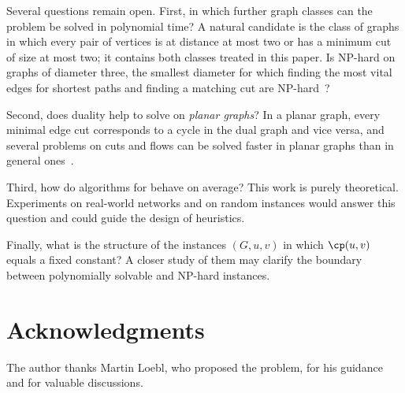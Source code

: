 Several questions remain open.
First, in which further graph classes can the problem be solved in polynomial time?
A natural candidate is the class of graphs in which every pair of vertices is at distance at most two or has a minimum cut of size at most two; it contains both classes treated in this paper.
Is \MinCutPath{} NP-hard on graphs of diameter three, the smallest diameter for which finding the most vital edges for shortest paths and finding a matching cut are NP-hard~\cite{Bazgan2019MostVital,LeLe2019MatchingCut}?

Second, does duality help to solve \MinCutPath{} on \emph{planar graphs}?
In a planar graph, every minimal edge cut corresponds to a cycle in the dual graph and vice versa, and several problems on cuts and flows can be solved faster in planar graphs than in general ones~\cite{itai1979maximum,henzinger1997faster}.

Third, how do algorithms for \MinCutPath{} behave on average?
This work is purely theoretical.
Experiments on real-world networks and on random instances would answer this question and could guide the design of heuristics.

Finally, what is the structure of the instances $(G, u, v)$ in which $\cp(u,v)$ equals a fixed constant?
A closer study of them may clarify the boundary between polynomially solvable and NP-hard instances.


\section*{Acknowledgments}

The author thanks Martin Loebl, who proposed the \MinCutPath{} problem, for his guidance and for valuable discussions.

